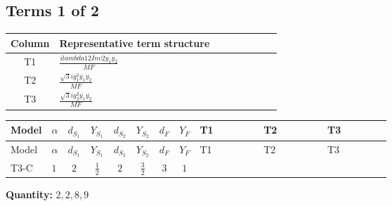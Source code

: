 \documentclass[8pt]{article}
\begin{document}
\begin{landscape}
\subsection*{Terms 1 of 2}
\begin{center}
\begin{tabular}{@{}c >{\raggedright\arraybackslash}p{0.82\linewidth}@{}}
\toprule
Column & Representative term structure \\
\midrule
T1 & \(\displaystyle \frac{i lambda12Inv2 \overline{y_{1}} \overline{y_{2}}}{MF}\) \\
\midrule
T2 & \(\displaystyle \frac{\sqrt{3} i g_{1}^{2} \overline{y_{1}} \overline{y_{2}}}{MF}\) \\
\midrule
T3 & \(\displaystyle \frac{\sqrt{3} i g_{2}^{2} \overline{y_{1}} \overline{y_{2}}}{MF}\) \\
\midrule
\bottomrule
\end{tabular}
\end{center}
\smallskip
\tiny
\begin{longtable}{@{}llcccccc >{\raggedright\arraybackslash}p{0.21\linewidth} >{\raggedright\arraybackslash}p{0.21\linewidth} >{\raggedright\arraybackslash}p{0.21\linewidth}@{}}
\toprule
Model & $\alpha$ & $d_{S_1}$ & $Y_{S_1}$ & $d_{S_2}$ & $Y_{S_2}$ & $d_F$ & $Y_F$ & T1 & T2 & T3 \\
\midrule
\endfirsthead
\toprule
Model & $\alpha$ & $d_{S_1}$ & $Y_{S_1}$ & $d_{S_2}$ & $Y_{S_2}$ & $d_F$ & $Y_F$ & T1 & T2 & T3 \\
\midrule
\endhead
T3-C & $1$ & $2$ & $\frac{1}{2}$ & $2$ & $\frac{3}{2}$ & $3$ & $1$ & \scriptsize\adjustbox{max width=\linewidth}{$\begin{gathered} \frac{i lambda12Inv2 \overline{y_{1}} \overline{y_{2}}}{3 MF}\end{gathered}$} & \scriptsize\adjustbox{max width=\linewidth}{$\begin{gathered} \frac{\sqrt{3} i g_{1}^{2} \overline{y_{1}} \overline{y_{2}}}{2 MF}\end{gathered}$} & \scriptsize\adjustbox{max width=\linewidth}{$\begin{gathered} \frac{\sqrt{3} i g_{2}^{2} \overline{y_{1}} \overline{y_{2}}}{4 MF}\end{gathered}$} \\
\midrule
\bottomrule
\end{longtable}
\clearpage
\noindent\textbf{Quantity: }$\mathrm{2,2,8,9}$\par\smallskip

\end{landscape}
\end{document}
